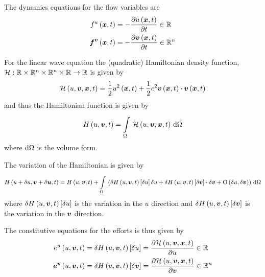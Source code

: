 The dynamics equations for the flow variables are
\begin{align}
  \fnof{f^{u}}{\vectr{x},t}&=-\delby{\fnof{u}{\vectr{x},t}}{t}\in\rntopology{} \\
  \fnof{\vectr{f}^{\vectr{v}}}{\vectr{x},t}&=-\delby{\fnof{\vectr{v}}{\vectr{x},t}}{t}\in\rntopology{n}
\end{align}

For the linear wave equation the (quadratic) Hamiltonian density function,
$\mapping{\hamiltoniandensitysym}{\spaceprodfour{\rntopology{}}{\rntopology{n}}{\rntopology{n}}{\rntopology{}}}{\rntopology{}}$
is given by
\begin{equation}
     \mathcal{H} \left( u, \boldsymbol{v} , \boldsymbol{x} ,t \right)  =\dfrac{1}{2} u^{2}\left(  \boldsymbol{x} ,t \right) +\dfrac{1}{2}c^{2}   \boldsymbol{v} \left(  \boldsymbol{x} ,t \right)   \cdot    \boldsymbol{v} \left(  \boldsymbol{x} ,t \right)  
\end{equation}
and thus the Hamiltonian function is given by
\begin{equation}
  \hamiltonian{u,\vectr{v},t}=\gint{\Omega}{}{\hamiltoniandensity{u,\vectr{v},\vectr{x},t}}{\Omega}
\end{equation}
where $  { \mathrm{d} }\Omega  $ is the volume form.

The variation of the Hamiltonian is given by
\begin{equation}
  \hamiltonian{u+\variationdir{u},\vectr{v}+\variationdir{\vectr{u}},t}=\hamiltonian{u,\vectr{v},t}+\gint{\Omega}{}{\pbrac{\variation{\hamiltonian{u,\vectr{v},t}}{u}\variationdir{u}+\dotprod{\variation{\hamiltonian{u,\vectr{v},t}}{\vectr{v}}}{\variationdir{\vectr{v}}}+\orderof{\variationdir{u},\variationdir{\vectr{v}}}}}{\Omega}
\end{equation}
where $   \delta     H \left( u, \boldsymbol{v} ,t \right)  \left[   \delta  u  \right]  $ is the variation in the $u$
direction and $   \delta     H \left( u, \boldsymbol{v} ,t \right)  \left[   \delta   \boldsymbol{v}   \right]  $ is the
variation in the $ \boldsymbol{v} $ direction.

The constitutive equations for the efforts is thus given by
\begin{align}
  \fnof{e^{u}}{u,\vectr{v},t}&=\variation{\hamiltonian{u,\vectr{v},t}}{u}=\delby{\hamiltoniandensity{u,\vectr{v},\vectr{x},t}}{u}\in\rntopology{}\\
  \fnof{\vectr{e}^{\vectr{v}}}{u,\vectr{v},t}&=\variation{\hamiltonian{u,\vectr{v},t}}{\vectr{v}}=\delby{\hamiltoniandensity{u,\vectr{v},\vectr{x},t}}{\vectr{v}}\in\rntopology{n}
\end{align}

